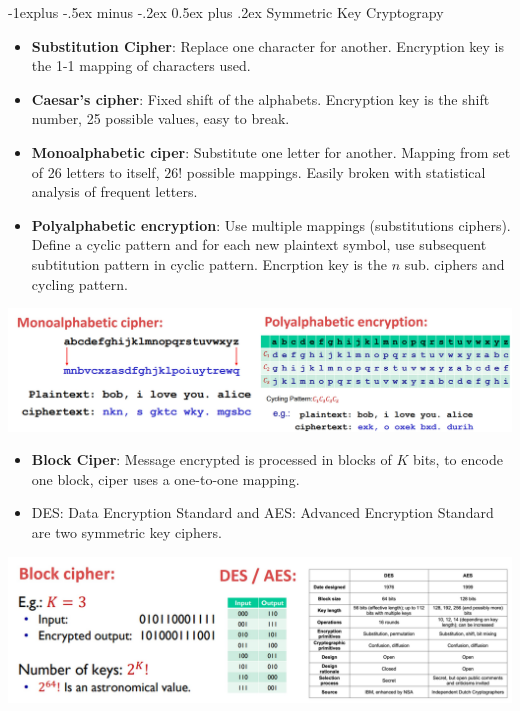 \documentclass[12pt, landscape]{article}
\makeatletter
\renewcommand{\subsection}{\@startsection{subsection}{2}{0.1mm}%
                                {-1explus -.5ex minus -.2ex}%
                                {0.5ex plus .2ex}%
                                {\normalfont\normalsize\bfseries}}
\makeatother
\begin{document}
\begin{multicols*}{3}
\columnbreak

\subsection{Symmetric Key Cryptograpy}
\begin{itemize}
\item \textbf{Substitution Cipher}: Replace one character for another. Encryption key is the 1-1 mapping of characters used.
\item \textbf{Caesar's cipher}: Fixed shift of the alphabets. Encryption key is the shift number, 25 possible values, easy to break.
\item \textbf{Monoalphabetic ciper}: Substitute one letter for another. Mapping from set of 26 letters to itself, $26!$ possible mappings. Easily broken with statistical analysis of frequent letters.
\item \textbf{Polyalphabetic encryption}: Use multiple mappings (substitutions ciphers). Define a cyclic pattern and for each new plaintext symbol, use subsequent subtitution pattern in cyclic pattern. Encrption key is the $n$ sub. ciphers and cycling pattern.
\end{itemize}
\centerline{\includegraphics[width=0.8\linewidth]{cipher}}
\begin{itemize}
\item \textbf{Block Ciper}: Message encrypted is processed in blocks of $K$ bits, to encode one block, ciper uses a one-to-one mapping.
\item DES: Data Encryption Standard and AES: Advanced Encryption Standard are two symmetric key ciphers.
\end{itemize}
\centerline{\includegraphics[width=0.9\linewidth]{blockcipher}}



\end{multicols*}
\end{document}
